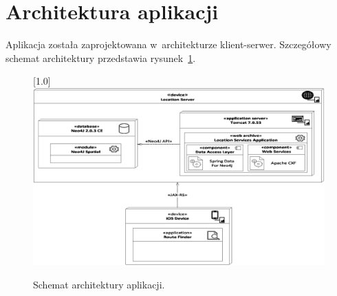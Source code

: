 \documentclass[a4paper,12pt]{article}
\begin{document}
	\section*{Architektura aplikacji}

	Aplikacja została zaprojektowana w~architekturze klient-serwer. Szczegółowy schemat architektury przedstawia rysunek~\ref{fig:architecture}. 

	\begin{figure}[ht!]
		\centering
		\scalebox{0.7}[1.0]{
			\includegraphics{graphics/architecture.eps}
		}

		\caption{Schemat architektury aplikacji.}
		\label{fig:architecture}
	\end{figure}
\end{document}
